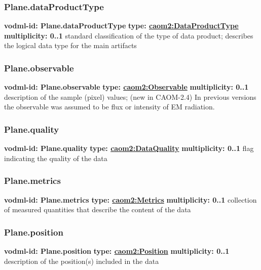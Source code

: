     \subsubsection{Plane.dataProductType}
      \textbf{vodml-id: Plane.dataProductType} \newline
      \textbf{type: \hyperref[sect:DataProductType]{caom2:DataProductType}} \newline
      \textbf{multiplicity: 0..1} \newline
      standard classification of the type of data product; describes the logical data type for the main artifacts

    \subsubsection{Plane.observable}
      \textbf{vodml-id: Plane.observable} \newline
      \textbf{type: \hyperref[sect:Observable]{caom2:Observable}} \newline
      \textbf{multiplicity: 0..1} \newline
      description of the sample (pixel) values; (new in CAOM-2.4) In previous versions the observable was assumed to be flux or intensity of EM radiation.

    \subsubsection{Plane.quality}
      \textbf{vodml-id: Plane.quality} \newline
      \textbf{type: \hyperref[sect:DataQuality]{caom2:DataQuality}} \newline
      \textbf{multiplicity: 0..1} \newline
      flag indicating the quality of the data

    \subsubsection{Plane.metrics}
      \textbf{vodml-id: Plane.metrics} \newline
      \textbf{type: \hyperref[sect:Metrics]{caom2:Metrics}} \newline
      \textbf{multiplicity: 0..1} \newline
      collection of measured quantities that describe the content of the data

    \subsubsection{Plane.position}
      \textbf{vodml-id: Plane.position} \newline
      \textbf{type: \hyperref[sect:Position]{caom2:Position}} \newline
      \textbf{multiplicity: 0..1} \newline
      description of the position(s) included in the data

